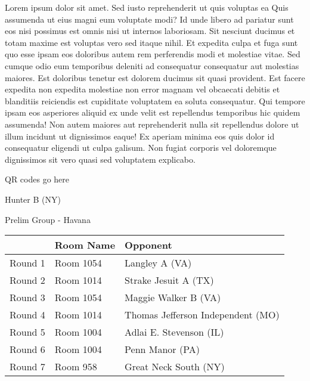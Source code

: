 \documentclass{article}%
\begin{document}
\vspace*{8pt}%
\linebreak%
\newline%
\newline%
Lorem ipsum dolor sit amet. Sed iusto reprehenderit ut quis voluptas ea Quis assumenda ut eius magni eum voluptate modi? Id unde libero ad pariatur sunt eos nisi possimus est omnis nisi ut internos laboriosam. Sit nesciunt ducimus et totam maxime est voluptas vero sed itaque nihil. Et expedita culpa et fuga sunt quo esse ipsam eos doloribus autem rem perferendis modi et molestiae vitae.\newline%
\newline%
Sed cumque odio eum temporibus deleniti ad consequatur consequatur aut molestias maiores. Est doloribus tenetur est dolorem ducimus sit quasi provident. Est facere expedita non expedita molestiae non error magnam vel obcaecati debitis et blanditiis reiciendis est cupiditate voluptatem ea soluta consequatur. Qui tempore ipsam eos asperiores aliquid ex unde velit est repellendus temporibus hic quidem assumenda!\newline%
\newline%
Non autem maiores aut reprehenderit nulla sit repellendus dolore ut illum incidunt ut dignissimos eaque! Ex aperiam minima eos quis dolor id consequatur eligendi ut culpa galisum. Non fugiat corporis vel doloremque dignissimos sit vero quasi sed voluptatem explicabo.\newline%
\newline%
%
\vspace*{30pt}%
\begin{center}%
\begin{Huge}%
QR codes go here%
\end{Huge}%
\end{center}%
\newpage%
%
\begin{center}%
\begin{Huge}%
Hunter B (NY)%
\end{Huge}%
\vspace*{8pt}%
\linebreak%
\begin{Large}%
Prelim Group {-} Havana%
\end{Large}%
\end{center}%
\begin{tabularx}{\textwidth}{|c|Y|Y|}%
\hline%
&Room Name&Opponent\\%
\hline%
Round 1&Room 1054&Langley A (VA)\\%
Round 2&Room 1014&Strake Jesuit A (TX)\\%
Round 3&Room 1054&Maggie Walker B (VA)\\%
Round 4&Room 1014&Thomas Jefferson Independent (MO)\\%
Round 5&Room 1004&Adlai E. Stevenson (IL)\\%
Round 6&Room 1004&Penn Manor (PA)\\%
Round 7&Room 958&Great Neck South (NY)\\%
\hline%
\end{tabularx}%
\end{document}
